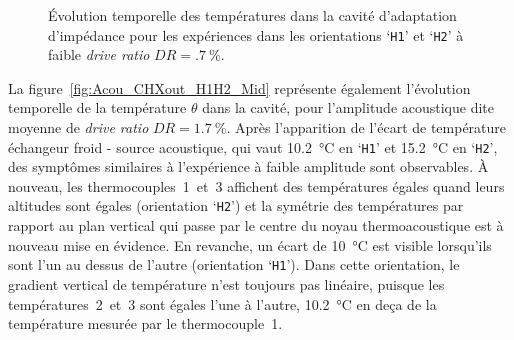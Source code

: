 
\begin{figure}[!ht]
    \centering
    
    \caption{\'Evolution temporelle des températures dans la cavité d'adaptation d'impédance pour les expériences dans les orientations `\texttt{H1}' et `\texttt{H2}' à faible \textit{drive ratio} $DR=\qty{.7}{\percent}$.}
    \label{fig:Acou_CHXout_H1H2_Low}
\end{figure}

La figure~\ref{fig:Acou_CHXout_H1H2_Mid} représente également l'évolution temporelle de la température $\theta$ dans la cavité, pour l'amplitude acoustique dite \og moyenne \fg{}  de \textit{drive ratio} $DR=\qty{1.7}{\percent}$. Après l'apparition de l'écart de température échangeur froid - source acoustique, qui vaut \qty{10.2}{\degreeCelsius} en `\texttt{H1}' et \qty{15.2}{\degreeCelsius} en `\texttt{H2}', des symptômes similaires à l'expérience à faible amplitude sont observables. À nouveau, les thermocouples~1~et~3 affichent des températures égales quand leurs altitudes sont égales (orientation `\texttt{H2}') et la symétrie des températures par rapport au plan vertical qui passe par le centre du noyau thermoacoustique est à nouveau mise en évidence. En revanche,  un écart de \qty{10}{\degreeCelsius} est visible lorsqu'ils sont l'un au dessus de l'autre (orientation `\texttt{H1}'). Dans cette orientation, le gradient vertical de température n'est toujours pas linéaire, puisque les températures~2~et~3 sont égales l'une à l'autre, \qty{10.2}{\degreeCelsius} en deça de la température mesurée par le thermocouple~1. 
\smallskip 

